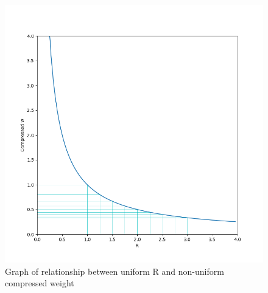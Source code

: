 \begin{figure}[H]
	\centering
	\includegraphics[scale=0.7]{rw.png}
	\caption{Graph of relationship between uniform R and non-uniform compressed weight}
	\label{fig:rwrel}
\end{figure}
